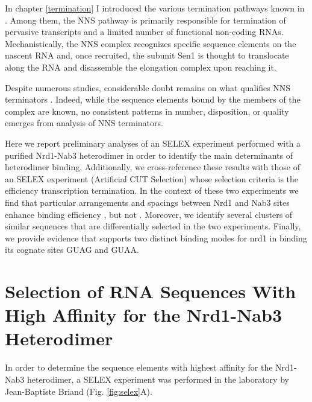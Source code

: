 \newpage
\mbox{}


In chapter \ref{termination} I introduced the various termination pathways known in \cer{}. Among them, the NNS pathway is primarily responsible for termination of pervasive transcripts and a limited number of functional non-coding RNAs. Mechanistically, the NNS complex recognizes specific sequence elements on the nascent RNA and, once recruited, the subunit Sen1 is thought to translocate along the RNA and disassemble the elongation complex upon reaching it. 

Despite numerous studies, considerable doubt remains on what qualifies NNS terminators \invivo{}. Indeed, while the sequence elements bound by the members of the complex are known, no consistent patterns in number, disposition, or quality emerges from analysis of \invivo{} NNS terminators. 

Here we report preliminary analyses of an \invitro{} SELEX experiment performed with a purified Nrd1-Nab3 heterodimer in order to identify the main determinants of heterodimer binding. Additionally, we cross-reference these results with those of an \invivo{} SELEX experiment (Artificial CUT Selection) whose selection criteria is the efficiency transcription termination. In the context of these two experiments we find that particular arrangements and spacings between Nrd1 and Nab3 sites enhance binding efficiency \invitro{}, but not \invivo{}. Moreover, we identify several clusters of similar sequences that are differentially selected in the two experiments. Finally, we provide evidence that supports two distinct binding modes for nrd1 in binding its cognate sites GUAG and GUAA.



\singlespacing
\section{\Invitro{} Selection of RNA Sequences With High Affinity for the Nrd1-Nab3 Heterodimer}
\doublespacing

In order to determine the sequence elements with highest affinity for the Nrd1-Nab3 heterodimer, a SELEX experiment was performed in the laboratory by Jean-Baptiste Briand (Fig. \ref{fig:selex}A). 

